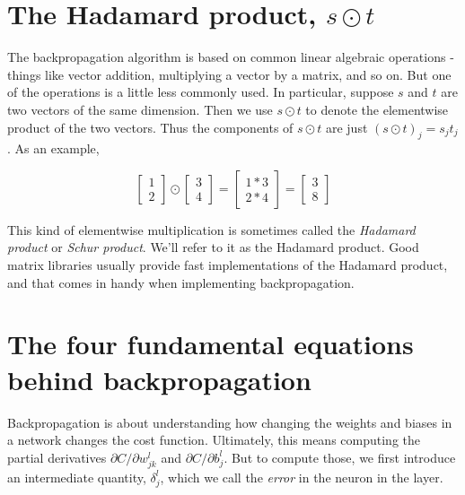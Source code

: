 \section{The Hadamard product, $s\odot t$}

The backpropagation algorithm is based on common linear algebraic operations - things like vector addition, multiplying a vector by a matrix, and so on. But one of the operations is a little less commonly used. In particular, suppose $s$
and $t$ are two vectors of the same dimension. Then we use $s\odot t$ to denote the elementwise product of the two vectors. Thus the components of $s\odot t$ are just $(s \odot t)_{j}=s_{j} t_{j}$. As an example, 

\begin{equation}
\left[ \begin{array}{l}{1} \\ {2}\end{array}\right] \odot \left[ \begin{array}{l}{3} \\ {4}\end{array}\right]=\left[ \begin{array}{l}{1 * 3} \\ {2 * 4}\end{array}\right]=\left[ \begin{array}{l}{3} \\ {8}\end{array}\right]
\label{eq:c02-28}
\end{equation}

This kind of elementwise multiplication is sometimes called the \textit{Hadamard product} or \textit{Schur product}. We'll refer to it as the Hadamard product. Good matrix libraries usually provide fast implementations of the Hadamard product, and that comes in handy when implementing backpropagation.


\section{The four fundamental equations behind backpropagation}

Backpropagation is about understanding how changing the weights and biases in a network changes the cost function. Ultimately, this means computing the partial derivatives $\partial C / \partial w_{j k}^{l}$ and $\partial C / \partial b_{j}^{l}$. But to compute those, we first introduce an intermediate quantity, $\delta_{j}^{l}$, which we call the \textit{error} in the  neuron in the  layer. 


